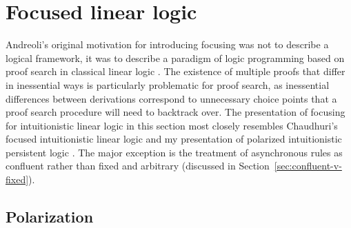 \section{Focused linear logic}
\label{sec:foclinlog}

Andreoli's original motivation for introducing focusing was not to
describe a logical framework, it was to describe a paradigm of logic
programming based on proof search in classical linear logic
\cite{andreoli92logic}. The existence of multiple proofs that differ
in inessential ways is particularly problematic for proof search, as
inessential differences between derivations correspond to unnecessary
choice points that a proof search procedure will need to backtrack
over. The presentation of focusing for intuitionistic linear logic in
this section most closely resembles Chaudhuri's focused intuitionistic
linear logic \cite{chaudhuri06focused} and my presentation of
polarized intuitionistic persistent logic
\cite{simmons11structural}. The major exception is the treatment of
asynchronous rules as confluent rather than fixed and arbitrary
(discussed in Section~\ref{sec:confluent-v-fixed}).

\subsection{Polarization}

